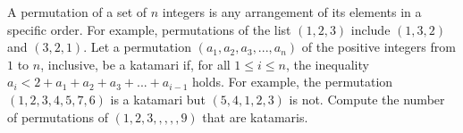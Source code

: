 A permutation of a set of $n$ integers is any arrangement of its elements in a specific order. For example, permutations of the list $(1, 2, 3)$ include $(1, 3, 2)$ and $(3, 2, 1)$. Let a permutation $(a_1, a_2, a_3, ..., a_n)$ of the positive integers from $1$ to $n$, inclusive, be a katamari if, for all $1 \le i \le n$, the inequality $a_i < 2 + a_1 + a_2 + a_3 +... + a_{i-1}$ holds. For example, the permutation $(1, 2, 3, 4, 5, 7, 6)$ is a katamari but $(5, 4, 1, 2, 3)$ is not. Compute the number of permutations of $(1, 2, 3,,,,, 9)$ that are katamaris.
